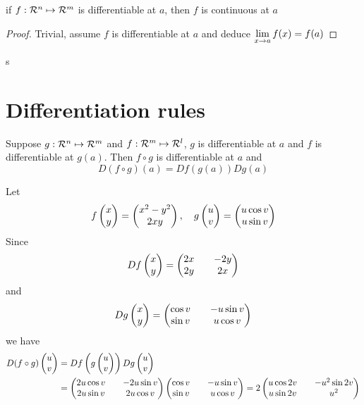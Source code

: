 \begin{prop}
    if $f: \mathcal{R}^{n} \mapsto \mathcal{R}^{m}$ is differentiable at $a$, then $f$ is continuous at $a$
\end{prop}
\begin{proof}
    Trivial, assume $f$ is differentiable at $a$ and deduce $\lim\limits_{x \to a}f(x) = f(a)$
\end{proof}
s
\section{Differentiation rules}
\begin{theorem}
    Suppose $g: \mathcal{R}^{n} \mapsto \mathcal{R}^{m}$ and $f: \mathcal{R}^{m} \mapsto \mathcal{R}^{l}$, $g$ is differentiable at $a$ and $f$ is differentiable at $g(a)$. Then $f \circ g$ is differentiable at $a$ and 
    $$D(f\circ g)(a) = Df(g(a))Dg(a)$$
\end{theorem}
\begin{eg}
    Let $$f\begin{pmatrix}x\\y\end{pmatrix} = \begin{pmatrix}x^{2}-y^{2}\\2xy\end{pmatrix}, \quad g\begin{pmatrix}u\\v\end{pmatrix} = \begin{pmatrix}u \cos v\\u \sin v\end{pmatrix}$$
    Since $$Df\begin{pmatrix}x\\y\end{pmatrix} = \begin{pmatrix}2x && -2y \\ 2y && 2x\end{pmatrix}$$ and $$Dg\begin{pmatrix}x\\y\end{pmatrix} = \begin{pmatrix}\cos v && -u\sin v \\ \sin v && u\cos v\end{pmatrix}$$
    we have 
    \begin{align}
        D(f\circ g) \begin{pmatrix}u\\v\end{pmatrix} &= Df\begin{pmatrix}g\begin{pmatrix}u\\v\end{pmatrix}\end{pmatrix}Dg\begin{pmatrix}u\\v\end{pmatrix}\\
        &= \begin{pmatrix}2u \cos v && -2u \sin v \\ 2u \sin v && 2u \cos v\end{pmatrix} \begin{pmatrix}\cos v && -u\sin v \\ \sin v && u\cos v\end{pmatrix} = 2\begin{pmatrix}u\cos 2v && -u^{2}\sin 2v \\ u\sin 2v && u^{2}\end{pmatrix}
    \end{align} 
\end{eg}

